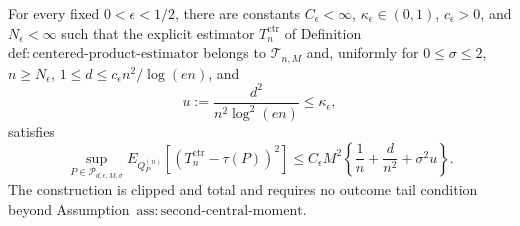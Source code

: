 For every fixed \(0<\epsilon<1/2\), there are constants \(C_{\epsilon}<\infty\), \(\kappa_{\epsilon}\in(0,1)\), \(c_{\epsilon}>0\), and \(N_{\epsilon}<\infty\) such that the explicit estimator \(T_n^{\mathrm{ctr}}\) of Definition~\(\mathrm{def:centered\text{-}product\text{-}estimator}\) belongs to \(\mathcal T_{n,M}\) and, uniformly for \(0\le\sigma\le2\), \(n\ge N_{\epsilon}\), \(1\le d\le c_{\epsilon}n^2/\log(en)\), and
\[
 u:=\frac{d^2}{n^2\log^2(en)}\le\kappa_{\epsilon},
\]
satisfies
\[
 \sup_{P\in\mathcal P_{d,\epsilon,M,\sigma}}
 E_{Q_P^{(n)}}[(T_n^{\mathrm{ctr}}-\tau(P))^2]
 \le C_{\epsilon}M^2\left\{
 \frac1n+\frac d{n^2}+\sigma^2u
 \right\}.
\]
The construction is clipped and total and requires no outcome tail condition beyond Assumption~\(\mathrm{ass:second\text{-}central\text{-}moment}\).